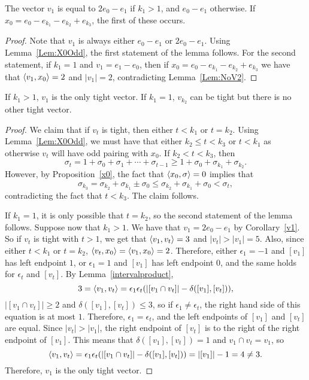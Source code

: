 \begin{cor}\label{v1}
The vector $v_1$ is equal to $2e_0 - e_1$ if $k_1 > 1$, and $e_0 - e_1$ otherwise. If ${x_0 = e_0 - e_{k_1} - e_{k_2} + e_{k_3}}$, the first of these occurs. 
\end{cor}
\begin{proof}
Note that $v_1$ is always either $e_0 - e_1$ or $2e_0 - e_1$. Using Lemma~\ref{Lem:X0Odd}, the first statement of the lemma follows. For the second statement, if $k_1 = 1$ and $v_1 = e_1 - e_0$, then if ${x_0 = e_0 - e_{k_1} - e_{k_2} + e_{k_3}}$ we have that $\left\langle v_1 , x_0 \right\rangle = 2$ and $|v_1| = 2$, contradicting Lemma~\ref{Lem:NoV2}. 
\end{proof}

\begin{lemma}\label{lem:tightvector}
If $k_1 > 1$, $v_1$ is the only tight vector. If $k_1 = 1$, $v_{k_2}$ can be tight but there is no other tight vector.
\end{lemma}
\begin{proof}
We claim that if $v_t$ is tight, then either $t < k_1$ or $t= k_2$. Using Lemma~\ref{Lem:X0Odd}, we must have that either $k_2 \le t < k_3$ or $t < k_1$ as otherwise $v_t$ will have odd pairing with $x_0$. If $k_2<t < k_3$, then 
\[
\sigma_t = 1 + \sigma_0 + \sigma_1 + \cdots + \sigma_{t-1} \ge 1 + \sigma_0 + \sigma_{k_1} + \sigma_{k_2}.
\]
 However, by Proposition~\ref{x0}, the fact that $\left\langle x_0 , \sigma \right\rangle = 0$ implies that
\begin{equation*}
\sigma_{k_3} = \sigma_{k_2} + \sigma_{k_1} \pm \sigma_0 \le \sigma_{k_2} + \sigma_{k_1} + \sigma_0 < \sigma_t,
\end{equation*}
contradicting the fact that $t < k_3$. The claim follows. 

If $k_1 = 1$, it is only possible that $t = k_2$, so the second statement of the lemma follows. Suppose now that $k_1 > 1$. We have that $v_1 = 2e_0 - e_1$ by Corollary~\ref{v1}. So if $v_t$ is tight with $t > 1$, we get that $\left\langle v_1 , v_t \right\rangle = 3$ and $|v_t| > |v_1| = 5$. Also, since either $t < k_1$ or $t = k_2$, $\left\langle v_t , x_0 \right\rangle = \left\langle v_1 , x_0 \right\rangle = 2$. Therefore, either $\epsilon_1 = -1$ and $[v_1]$ has left endpoint $1$, or $\epsilon_1 = 1$ and $[v_1]$ has left endpoint $0$, and the same holds for $\epsilon_t$ and $[v_t]$. By Lemma~\ref{intervalproduct}, 
\begin{equation*}
3 = \left\langle v_1 , v_t \right\rangle = \epsilon_1\epsilon_t(|[v_1 \cap v_t]| - \delta([v_1],[v_t]) ),
\end{equation*}
$|[v_1 \cap v_t]| \ge 2$ and $\delta([v_1],[v_t]) \le 3$, so if $\epsilon_1\neq \epsilon_t$, the right hand side of this equation is at most $1$. Therefore, $\epsilon_1 = \epsilon_t$, and the left endpoints of $[v_1]$ and $[v_t]$ are equal. Since $|v_t| > |v_1|$, the right endpoint of $[v_t]$ is to the right of the right endpoint of $[v_1]$. This means that $\delta([v_1],[v_t]) = 1$ and $v_1 \cap v_t =v_1$, so
\begin{equation*}
\left\langle v_1 , v_t \right\rangle = \epsilon_1\epsilon_t(|[v_1 \cap v_t]| - \delta([v_1],[v_t]) ) = |[v_1]| - 1 = 4 \neq 3.
\end{equation*}
Therefore, $v_1$ is the only tight vector.
\end{proof}

